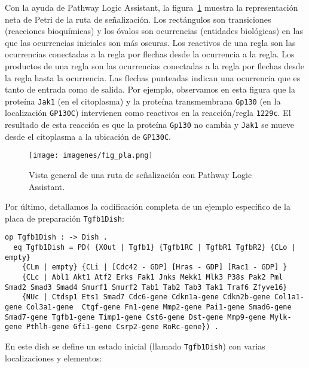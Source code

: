 Con la ayuda de Pathway Logic Assistant, la figura~\ref{fig:fig_pla} muestra la representación neta de Petri de la ruta de señalización. Los rectángulos son transiciones (reacciones bioquímicas) y los óvalos son ocurrencias (entidades biológicas) en las que las ocurrencias iniciales son más oscuras. Los reactivos de una regla son las ocurrencias conectadas a la regla por flechas desde la ocurrencia a la regla. Los productos de una regla son las ocurrencias conectadas a la regla por flechas desde la regla hasta la ocurrencia. Las flechas punteadas indican una ocurrencia que es tanto de entrada como de salida. 
%
Por ejemplo, observamos en esta figura que la proteína \texttt{Jak1} (en el citoplasma) y la proteína transmembrana \texttt{Gp130} (en la localización \texttt{GP130C}) intervienen como reactivos en la reacción/regla \texttt{1229c}. El resultado de esta reacción es que la proteína \texttt{Gp130} no cambia y \texttt{Jak1} se mueve desde el citoplasma a la ubicación de \texttt{GP130C}.

\begin{figure}[h!]
\centering
\texttt{[image: imagenes/fig\_pla.png]}
\caption[Pathway Logic Assistant]{Vista general de una ruta de señalización con Pathway Logic Assistant.}
\label{fig:fig_pla}
\end{figure}


Por último, detallamos la codificación completa de un ejemplo específico de la placa de preparación \texttt{Tgfb1Dish}: 

\begin{lstlisting}[language=Maude,caption={Dish \texttt{Tgfb1Dish}},label=lst:DishTgfb1Dish]
  op Tgfb1Dish : -> Dish .
  eq Tgfb1Dish = PD( {XOut | Tgfb1} {Tgfb1RC | TgfbR1 TgfbR2} {CLo | empty} 
    {CLm | empty} {CLi | [Cdc42 - GDP] [Hras - GDP] [Rac1 - GDP] }
    {CLc | Abl1 Akt1 Atf2 Erks Fak1 Jnks Mekk1 Mlk3 P38s Pak2 Pml Smad2 Smad3 Smad4 Smurf1 Smurf2 Tab1 Tab2 Tab3 Tak1 Traf6 Zfyve16}
    {NUc | Ctdsp1 Ets1 Smad7 Cdc6-gene Cdkn1a-gene Cdkn2b-gene Col1a1-gene Col3a1-gene  Ctgf-gene Fn1-gene Mmp2-gene Pai1-gene Smad6-gene Smad7-gene Tgfb1-gene Timp1-gene Cst6-gene Dst-gene Mmp9-gene Mylk-gene Pthlh-gene Gfi1-gene Csrp2-gene RoRc-gene}) .
\end{lstlisting}
\medskip

\noindent%
En este dish se define un estado inicial (llamado \texttt{Tgfb1Dish}) con varias localizaciones y elementos: 

